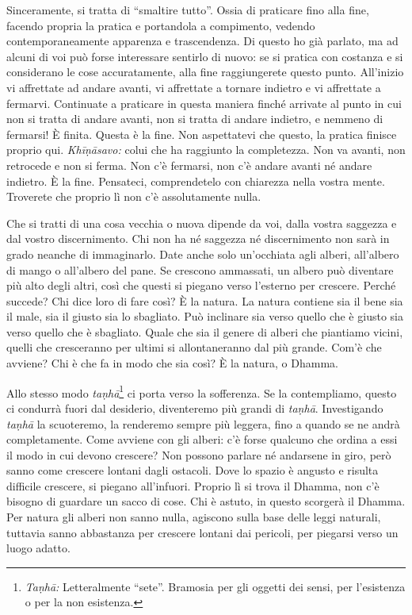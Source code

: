 Sinceramente, si tratta di ``smaltire tutto''. Ossia di praticare fino
alla fine, facendo propria la pratica e portandola a compimento, vedendo
contemporaneamente apparenza e trascendenza. Di questo ho già parlato,
ma ad alcuni di voi può forse interessare sentirlo di nuovo: se si
pratica con costanza e si considerano le cose accuratamente, alla fine
raggiungerete questo punto. All'inizio vi affrettate ad andare avanti,
vi affrettate a tornare indietro e vi affrettate a fermarvi. Continuate
a praticare in questa maniera finché arrivate al punto in cui non si
tratta di andare avanti, non si tratta di andare indietro, e nemmeno di
fermarsi! È finita. Questa è la fine. Non aspettatevi che questo, la
pratica finisce proprio qui. \emph{Khīṇāsavo:} colui che ha raggiunto la
completezza. Non va avanti, non retrocede e non si ferma. Non c'è
fermarsi, non c'è andare avanti né andare indietro. È la fine.
Pensateci, comprendetelo con chiarezza nella vostra mente. Troverete che
proprio lì non c'è assolutamente nulla.

Che si tratti di una cosa vecchia o nuova dipende da voi, dalla vostra
saggezza e dal vostro discernimento. Chi non ha né saggezza né
discernimento non sarà in grado neanche di immaginarlo. Date anche solo
un'occhiata agli alberi, all'albero di mango o all'albero del pane. Se
crescono ammassati, un albero può diventare più alto degli altri, così
che questi si piegano verso l'esterno per crescere. Perché succede? Chi
dice loro di fare così? È la natura. La natura contiene sia il bene sia
il male, sia il giusto sia lo sbagliato. Può inclinare sia verso quello
che è giusto sia verso quello che è sbagliato. Quale che sia il genere
di alberi che piantiamo vicini, quelli che cresceranno per ultimi si
allontaneranno dal più grande. Com'è che avviene? Chi è che fa in modo
che sia così? È la natura, o Dhamma.

Allo stesso modo \emph{taṇhā}\footnote{\emph{Taṇhā:} Letteralmente
  ``sete''. Bramosia per gli oggetti dei sensi, per l'esistenza o per la
  non esistenza.} ci porta verso la sofferenza. Se la contempliamo,
questo ci condurrà fuori dal desiderio, diventeremo più grandi di
\emph{taṇhā}. Investigando \emph{taṇhā} la scuoteremo, la renderemo
sempre più leggera, fino a quando se ne andrà completamente. Come
avviene con gli alberi: c'è forse qualcuno che ordina a essi il modo in
cui devono crescere? Non possono parlare né andarsene in giro, però
sanno come crescere lontani dagli ostacoli. Dove lo spazio è angusto e
risulta difficile crescere, si piegano all'infuori. Proprio lì si trova
il Dhamma, non c'è bisogno di guardare un sacco di cose. Chi è astuto,
in questo scorgerà il Dhamma. Per natura gli alberi non sanno nulla,
agiscono sulla base delle leggi naturali, tuttavia sanno abbastanza per
crescere lontani dai pericoli, per piegarsi verso un luogo adatto.

